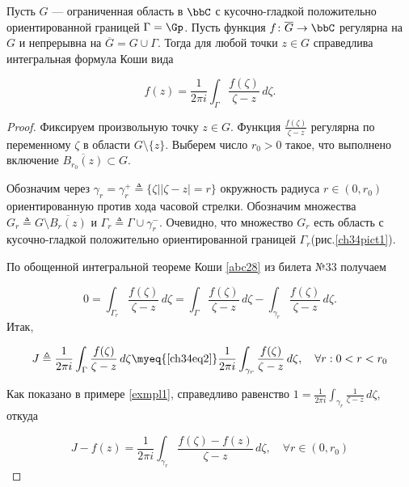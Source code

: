\begin{thm} \label{ch34thm1}

Пусть $G$ --- ограниченная область в $\bbC$ с кусочно-гладкой положительно ориентированной границей $\Gamma= \Gp$. Пусть функция $f\colon \overline{G}\to \bbC$ регулярна на $G$ и непрерывна на $\overline{G}=G\cup\Gamma$. Тогда для любой точки $z\in G$ справедлива интегральная формула Коши вида
 
 \begin{equation} \label{ch34eq1}
 f(z) = \frac{1}{2\pi i}\int_\Gamma \frac{f(\zeta)}{\zeta - z}\,d\zeta.
 \end{equation}
\end{thm}
\begin{proof}
Фиксируем произвольную точку $z \in G$. Функция $\frac{f(\zeta)}{\zeta - z}$ регулярна по переменному $\zeta$ в области $G \setminus \{z\}$. Выберем число $r_0 > 0$ такое, что выполнено включение $\overline{B_{r_0}(z)}\subset G$. 

\label{ch34pict1}
Обозначим через $\gamma_r=\gamma_r^{+} \triangleq \{ \zeta \bigl| |\zeta - z| = r \}$ окружность радиуса $r \in (0, r_0)$ ориентированную против хода часовой стрелки. Обозначим множества $G_r \triangleq G \setminus \overline{B_r(z)}$ и $\Gamma_r \triangleq \Gamma \cup \gamma_r^{-}$. Очевидно, что множество $G_r$ есть область с кусочно-гладкой положительно ориентированной границей $\Gamma_r$(рис.\ref{ch34pict1}). 

По обощенной интегральной теореме Коши \ref{abc28} из билета №33 получаем

 \begin{equation} \label{ch34eq2}
 0 = \int_{\Gamma_r} \frac{f(\zeta)}{\zeta - z}\,d\zeta = \int_\Gamma \frac{f(\zeta)}{\zeta - z}\,d\zeta - \int_{\gamma_r} \frac{f(\zeta)}{\zeta - z}\,d\zeta.
 \end{equation}
Итак,

\begin{equation} \label{ch34eq3}
J \triangleq \frac{1}{2\pi i} \int_\Gamma \frac{f(\zeta)}{\zeta - z}\,d\zeta \myeq{\eqref{ch34eq2}} \frac{1}{2\pi i} \int_{\gamma_r} \frac{f(\zeta)}{\zeta - z}\,d\zeta,  \quad  \forall r: 0 < r < r_0
\end{equation}

Как показано в примере \ref{exmpl1}, справедливо равенство $1 = \frac{1}{2\pi i} \int_{\gamma_r} \frac{1}{\zeta - z}\,d\zeta$, откуда 

$$J - f(z) = \frac{1}{2\pi i} \int_{\gamma_r} \frac{f(\zeta) - f(z)}{\zeta - z}\,d\zeta, \quad  \forall r \in (0,r_0)$$


\end{proof}
